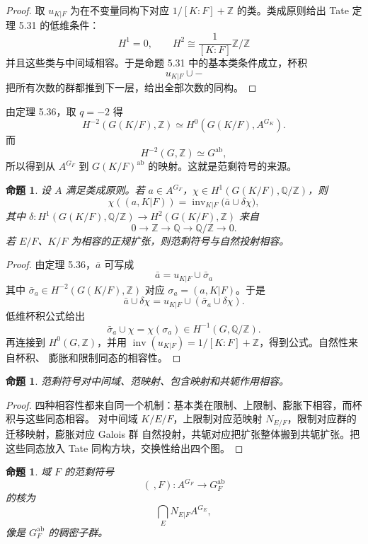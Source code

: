 \documentclass[11pt,a4paper,openany]{ctexbook}
\numberwithin{equation}{chapter}
\newcommand{\Q}{\mathbb{Q}}
\newcommand{\Z}{\mathbb{Z}}
\theoremstyle{plain}
\newtheorem{proposition}[theorem]{命题}
\theoremstyle{definition}
\theoremstyle{remark}
\begin{document}
\begin{proof}
取 $u_{K|F}$ 为在不变量同构下对应 $1/[K:F]+\Z$ 的类。类成原则给出 Tate 定理 5.31 的低维条件：
\[
H^1=0,\qquad H^2\cong \frac1{[K:F]}\Z/\Z
\]
并且这些类与中间域相容。于是命题 5.31 中的基本类条件成立，杯积
\[
u_{K|F}\cup-
\]
把所有次数的群都推到下一层，给出全部次数的同构。
\end{proof}

由定理 5.36，取 $q=-2$ 得
\[
 H^{-2}(G(K/F),\Z)\simeq H^0(G(K/F),A^{G_K}).
\]
而
\[
 H^{-2}(G,\Z)\simeq G^{\operatorname{ab}},
\]
所以得到从 $A^{G_F}$ 到 $G(K/F)^{\operatorname{ab}}$ 的映射。这就是范剩符号的来源。

\begin{proposition}
设 $A$ 满足类成原则。若 $a\in A^{G_F}$，$\chi\in H^1(G(K/F),\Q/\Z)$，则
\[
 \chi((a,K|F))
 =
 \operatorname{inv}_{K|F}\bigl(\bar a\cup\delta\chi\bigr),
\]
其中 $\delta:H^1(G(K/F),\Q/\Z)\to H^2(G(K/F),\Z)$ 来自
\[
 0\to\Z\to\Q\to\Q/\Z\to0.
\]
若 $E/F$、$K/F$ 为相容的正规扩张，则范剩符号与自然投射相容。
\end{proposition}

\begin{proof}
由定理 5.36，$\bar a$ 可写成
\[
 \bar a=u_{K|F}\cup \bar\sigma_a
\]
其中 $\bar\sigma_a\in H^{-2}(G(K/F),\Z)$ 对应 $\sigma_a=(a,K|F)$。于是
\[
 \bar a\cup\delta\chi
 =
 u_{K|F}\cup(\bar\sigma_a\cup\delta\chi).
\]
低维杯积公式给出
\[
 \bar\sigma_a\cup\chi=\chi(\sigma_a)\in H^{-1}(G,\Q/\Z).
\]
再连接到 $H^0(G,\Z)$，并用 $\operatorname{inv}(u_{K|F})=1/[K:F]+\Z$，得到公式。自然性来自杯积、
膨胀和限制同态的相容性。
\end{proof}

\begin{proposition}
范剩符号对中间域、范映射、包含映射和共轭作用相容。
\end{proposition}

\begin{proof}
四种相容性都来自同一个机制：基本类在限制、上限制、膨胀下相容，而杯积与这些同态相容。
对中间域 $K/E/F$，上限制对应范映射 $N_{E/F}$，限制对应群的迁移映射，膨胀对应 Galois 群
自然投射，共轭对应把扩张整体搬到共轭扩张。把这些同态放入 Tate 同构方块，交换性给出四个图。
\end{proof}

\begin{proposition}
域 $F$ 的范剩符号
\[
 (\ ,F):A^{G_F}\to G_F^{\operatorname{ab}}
\]
的核为
\[
 \bigcap_E N_{E|F}A^{G_E},
\]
像是 $G_F^{\operatorname{ab}}$ 的稠密子群。
\end{proposition}
\end{document}
